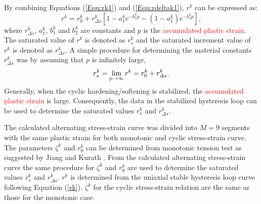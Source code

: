 \documentclass[preprint,5p,twocolumn,11pt,sort&compress]{elsarticle}
\newcommand{\marked}[1]{\textcolor{red}{#1}}
\begin{document}
By combining Equations (\ref{Equ:rk1}) and (\ref{Equ:rdeltak1}), $r^k$ can be expressed as:
\begin{equation}\label{rk}
{r^k} = r_0^k + r_{\Delta s}^k\left[ {1 - a_1^k{e^{ - b_1^kp}} - (1-a_1^k){e^{ - b_2^kp}} }\right],
\end{equation}
where $r_{\Delta s}^k$, $a_1^k$, $b_1^k$ and $b_2^k$ are constants and $p$ is the \marked{accumulated plastic strain}.
The saturated value of $r^k$ is denoted as $r^k_s$ and the saturated increment value of $r^k$ is denoted as $r^k_{\Delta s}$.
A simple procedure for determining the material constants $r_{\Delta s}^k$ was by assuming that $p$ is infinitely large,
\begin{equation}
r_s^k=\mathop {\lim }\limits_{{\rm{p}} \to \infty } {r^k} = r_0^k + r_{\Delta s}^k.
\label{Equ:rsk}
\end{equation}
Generally, when the cyclic hardening/softening is stabilized, the \marked{accumulated plastic strain} is large.
Consequently, the data in the stabilized hysteresis loop can be used to determine the saturated values $r^k_s$ and $r^k_{\Delta s}$.

The calculated alternating stress-strain curve was  divided into $M=9$ segments with the same plastic strain for both monotonic and cyclic stress-strain curve. The parameters $\zeta^k$ and $r_0^k$ can be determined from monotonic tension test as suggested by Jiang and Kurath \cite{Jiang1996387}. From the calculated alternating stress-strain curve the same procedure for $\zeta^k$ and $r_0^k$ are used to determine the saturated values $r^k_s$ and $r^k_{\Delta s}$.  $r^k$ is determined from the uniaxial stable hysteresis loop curve following Equation (\ref{rk}). ${\zeta ^k}$ for the cyclic stress-strain relation are the same as those for the monotonic case.

\end{document}
